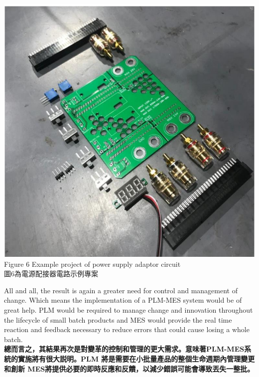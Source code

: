 \documentclass[24pt]{article} %
\begin{document}
\begin{center}
\includegraphics[width=15cm]{6.png}\\

Figure 6 Example project of power supply adaptor circuit   \\

圖6為電源配接器電路示例專案 \\

\end{center}

All and all, the result is again a greater need for control and management of change. Which means the implementation of a PLM-MES system would be of great help. PLM would be required to manage change and innovation throughout the lifecycle of small batch products and MES would provide the real time reaction and feedback necessary to reduce errors that could cause losing a whole batch. \\

\textbf{總而言之，其結果再次是對變革的控制和管理的更大需求。意味著PLM-MES系統的實施將有很大説明。PLM 將是需要在小批量產品的整個生命週期內管理變更和創新 MES將提供必要的即時反應和反饋，以減少錯誤可能會導致丟失一整批。}\\
\end{document}
